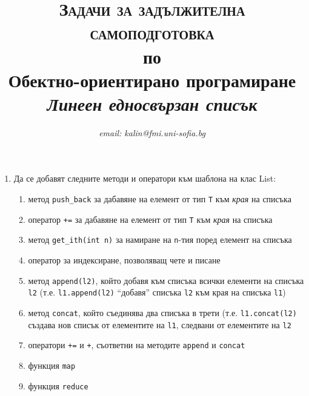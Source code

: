 \documentclass[12pt,a4paper]{article}
\author{\textit{email: kalin@fmi.uni-sofia.bg}}
\title{\textsc{Задачи за задължителна самоподготовка} \\
по \\
Обектно-ориентирано програмиране\\
\textit{Линеен едносвързан списък}}
\newcommand{\code}[1]{\texttt{#1}}
\begin{document}
\maketitle


\begin{enumerate}

	\item Да се добавят следните методи и оператори към шаблона на клас List:

	\begin{enumerate}
		\item метод \code{push\_back} за дабавяне на елемент от тип \code{T} към \textit{края} на списъка
		\item оператор \code{+=} за дабавяне на елемент от тип \code{T} към \textit{края} на списъка
		\item метод \code{get\_ith(int n)} за намиране на \code{n}-тия поред елемент на списъка
		\item оператор за индексиране, позволяващ чете и писане
		\item метод \code{append(l2)}, който добавя към списъка всички елементи на списъка \code{l2} (т.е. \code{l1.append(l2)} ``добавя'' списъка \code{l2} към края на списъка \code{l1})
		\item метод \code{concat}, който съединява два списъка в трети (т.е. \code{l1.concat(l2)} създава нов списък от елементите на \code{l1}, следвани от елементите на \code{l2}
		\item оператори \code{+=} и \code{+}, съответни на методите \code{append} и \code{concat}
		\item функция \code{map}
		\item функция \code{reduce}
	\end{enumerate}
\end{enumerate}


	\vspace{20px}
\end{document}
